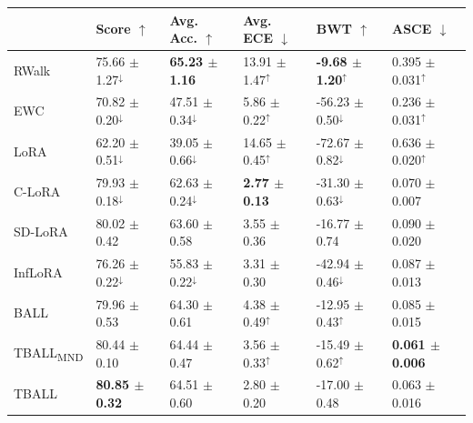 \begin{tabular}{llllll}
\toprule
 & {\small Score $\uparrow$} & {\small Avg. Acc. $\uparrow$} & {\small Avg. ECE $\downarrow$} & {\small BWT $\uparrow$} & {\small ASCE $\downarrow$} \\
\midrule
RWalk & \small 75.66 $\pm$ 1.27$^{\downarrow}$ & \small \textbf{65.23 $\pm$ 1.16} & \small 13.91 $\pm$ 1.47$^{\uparrow}$ & \small \textbf{-9.68 $\pm$ 1.20}$^{\uparrow}$ & \small 0.395 $\pm$ 0.031$^{\uparrow}$ \\
EWC & \small 70.82 $\pm$ 0.20$^{\downarrow}$ & \small 47.51 $\pm$ 0.34$^{\downarrow}$ & \small 5.86 $\pm$ 0.22$^{\uparrow}$ & \small -56.23 $\pm$ 0.50$^{\downarrow}$ & \small 0.236 $\pm$ 0.031$^{\uparrow}$ \\
LoRA & \small 62.20 $\pm$ 0.51$^{\downarrow}$ & \small 39.05 $\pm$ 0.66$^{\downarrow}$ & \small 14.65 $\pm$ 0.45$^{\uparrow}$ & \small -72.67 $\pm$ 0.82$^{\downarrow}$ & \small 0.636 $\pm$ 0.020$^{\uparrow}$ \\
C-LoRA & \small 79.93 $\pm$ 0.18$^{\downarrow}$ & \small 62.63 $\pm$ 0.24$^{\downarrow}$ & \small \textbf{2.77 $\pm$ 0.13} & \small -31.30 $\pm$ 0.63$^{\downarrow}$ & \small 0.070 $\pm$ 0.007 \\
SD-LoRA & \small 80.02 $\pm$ 0.42 & \small 63.60 $\pm$ 0.58 & \small 3.55 $\pm$ 0.36 & \small -16.77 $\pm$ 0.74 & \small 0.090 $\pm$ 0.020 \\
InfLoRA & \small 76.26 $\pm$ 0.22$^{\downarrow}$ & \small 55.83 $\pm$ 0.22$^{\downarrow}$ & \small 3.31 $\pm$ 0.30 & \small -42.94 $\pm$ 0.46$^{\downarrow}$ & \small 0.087 $\pm$ 0.013 \\
BALL & \small 79.96 $\pm$ 0.53 & \small 64.30 $\pm$ 0.61 & \small 4.38 $\pm$ 0.49$^{\uparrow}$ & \small -12.95 $\pm$ 0.43$^{\uparrow}$ & \small 0.085 $\pm$ 0.015 \\
TBALL\textsubscript{MND} & \small 80.44 $\pm$ 0.10 & \small 64.44 $\pm$ 0.47 & \small 3.56 $\pm$ 0.33$^{\uparrow}$ & \small -15.49 $\pm$ 0.62$^{\uparrow}$ & \small \textbf{0.061 $\pm$ 0.006} \\
TBALL & \small \textbf{80.85 $\pm$ 0.32} & \small 64.51 $\pm$ 0.60 & \small 2.80 $\pm$ 0.20 & \small -17.00 $\pm$ 0.48 & \small 0.063 $\pm$ 0.016 \\
\bottomrule
\end{tabular}
